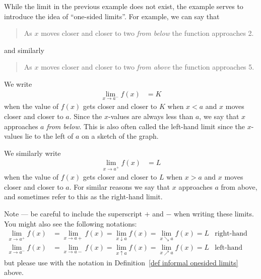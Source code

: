 While the limit in the previous example does not exist, the example serves to
introduce the idea of ``one-sided limits''. For example, we can say that
\begin{quote}
 As $x$ moves closer and closer to two \emph{from below} the function
approaches 2.
\end{quote}
and similarly
\begin{quote}
 As $x$ moves closer and closer to two \emph{from above} the function
approaches 5.
\end{quote}

\begin{defn}
\label{def informal onesided limits}
We write
\begin{align*}
\lim_{x \to a^-} f(x) &= K
\end{align*}
when the value of $f(x)$ gets closer and closer to $K$ when $x<a$ and $x$ moves
closer and closer to $a$. Since the $x$-values are always less than $a$, we say
that $x$ approaches $a$ \emph{from below}. This is also often called the
left-hand limit since the $x$-values lie to the left of $a$ on a sketch of the
graph.


We similarly write
\begin{align*}
\lim_{x \to a^+} f(x) &= L
\end{align*}
when the value of $f(x)$ gets closer and closer to $L$ when $x>a$ and $x$
moves closer and closer to $a$. For similar reasons we say that $x$ approaches
$a$ from above, and sometimes refer to this as the right-hand limit.
\end{defn}
Note --- be careful to include the superscript $+$ and $-$ when writing
these limits. You might also see the following notations:
\begin{align*}
\lim_{x \to a^+} f(x) &= \lim_{x \to a+} f(x) = \lim_{x \downarrow a} f(x) =
\lim_{x \searrow a} f(x) = L & \text{right-hand limit}\\
\lim_{x \to a^-} f(x) &= \lim_{x \to a-} f(x) = \lim_{x \uparrow a} f(x) =
\lim_{x \nearrow a} f(x) = L & \text{left-hand limit}
\end{align*}
but please use with the notation in Definition~\ref{def informal onesided
limits} above.

